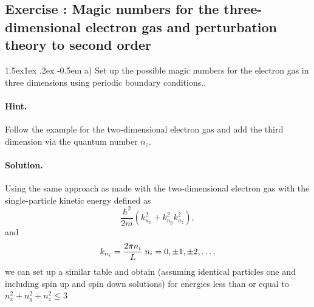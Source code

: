 \documentclass[%
oneside,                 %
final,                   %
10pt]{article}
\makeatletter
\newenvironment{doconceexercise}{}{}
\newcounter{doconceexercisecounter}
\newcommand\subex{\@startsection{paragraph}{4}{\z@}%
                  {1.5ex\@plus1ex \@minus.2ex}%
                  {-0.5em}%
                  {\normalfont\normalsize\bfseries}}
\makeatother
\begin{document}
\begin{doconceexercise}

\subsection*{Exercise \thedoconceexercisecounter: Magic numbers for the three-dimensional electron gas and perturbation theory to second order}



\subex{a)}
Set up the possible magic numbers for the electron gas in three dimensions using periodic boundary conditions..


\paragraph{Hint.}
Follow the example for the two-dimensional electron gas and add the third dimension via the quantum number $n_z$.



\paragraph{Solution.}
Using the same approach as made with the two-dimensional electron gas with the single-particle kinetic energy defined as
\[
\frac{\hbar^2}{2m}\left(k_{n_x}^2+k_{n_y}^2k_{n_z}^2\right),
\]
and 
\[
k_{n_i}=\frac{2\pi n_i}{L} \hspace{0.1cm} n_i = 0, \pm 1, \pm 2, \dots, 
\]
we can set up a similar table and obtain (assuming identical particles one and including spin up and spin down solutions)  for energies less than or equal to $n_{x}^{2}+n_{y}^{2}+n_{z}^{2}\le 3$



\end{doconceexercise}
\end{document}
